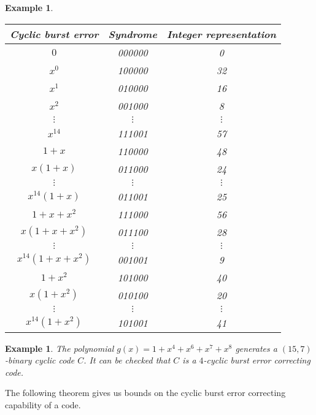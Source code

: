\documentclass[10pt]{article}
\theoremstyle{newstyle}
\newtheorem{exmp}[thm]{Example}
\begin{document}
\begin{exmp}
\begin{table}[H]
\centering
\begin{tabular}{c|c|c}
Cyclic burst error & Syndrome & Integer representation \\ \hline
$0$                & 000000   & 0                      \\ \hline
$x^0$              & 100000   & 32                     \\
$x^1$              & 010000   & 16                     \\
$x^2$              & 001000   & 8                      \\
$\vdots$           & $\vdots$ & $\vdots$               \\
$x^{14}$           & 111001   & 57                     \\ \hline
$1+x$              & 110000   & 48                     \\
$x(1+x)$           & 011000   & 24                     \\
$\vdots$           & $\vdots$ & $\vdots$               \\
$x^{14}(1+x)$      & 011001   & 25                     \\ \hline
$1+x+x^2$          & 111000   & 56                     \\
$x(1+x+x^2)$       & 011100   & 28                     \\
$\vdots$           & $\vdots$ & $\vdots$               \\
$x^{14}(1+x+x^2)$  & 001001   & 9                      \\ \hline
$1+x^2$            & 101000   & 40                     \\
$x(1+x^2)$         & 010100   & 20                     \\
$\vdots$           & $\vdots$ & $\vdots$               \\
$x^{14}(1+x^2)$    & 101001   & 41                    
\end{tabular}
\end{table}
\end{exmp}

\begin{exmp}
The polynomial $g(x) = 1+x^4 + x^6 + x^7 + x^8$ generates a $(15, 7)$-binary cyclic code $C$. It 
can be checked that $C$ is a $4$-cyclic burst error correcting code. 
\end{exmp}

The following theorem gives us bounds on the cyclic burst error correcting capability of a code. 
\end{document}
